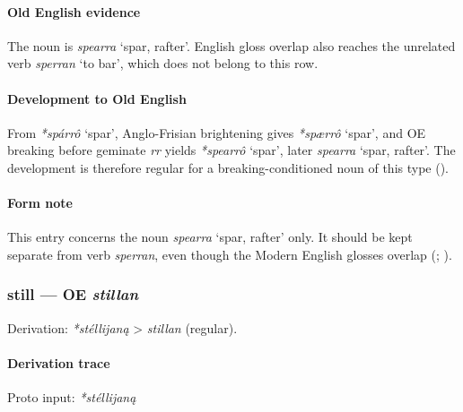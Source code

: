 \documentclass[
  british,
  a4paper,
]{article}
\providecommand{\Recon}[1]{\emph{*#1}}
\begin{document}
\paragraph{Old English evidence}\label{old-english-evidence-53}

The noun is {\emph{spearra}} `spar, rafter'. English gloss overlap also
reaches the unrelated verb \emph{sperran} `to bar', which does not
belong to this row.

\paragraph{Development to Old
English}\label{development-to-old-english-53}

From \Recon{spárrô} `spar', Anglo-Frisian brightening gives
\Recon{spærrô} `spar', and OE breaking before geminate \emph{rr} yields
\Recon{spearrô} `spar', later {\emph{spearra}} `spar, rafter'. The
development is therefore regular for a breaking-conditioned noun of this
type ().

\paragraph{Form note}\label{form-note-19}

This entry concerns the noun {\emph{spearra}} `spar, rafter' only. It
should be kept separate from verb \emph{sperran}, even though the Modern
English glosses overlap (;
).

\subsubsection{\texorpdfstring{still --- OE
\emph{stillan}}{still --- OE stillan}}\label{still-oe-stillan}

Derivation: \emph{*stéllijaną} \textgreater{} \emph{stillan} (regular).

\paragraph{Derivation trace}\label{derivation-trace-58}

Proto input: \emph{*stéllijaną}

\begingroup
\setlength{\fboxsep}{6pt}
\end{document}
